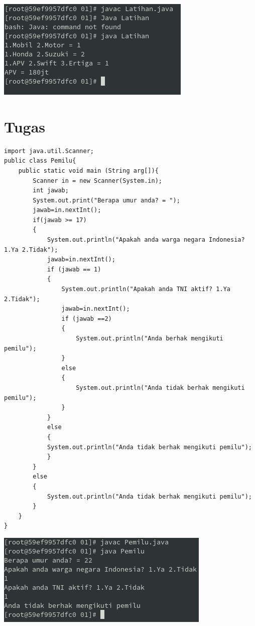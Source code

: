 \documentclass[a4paper,12pt]{article}
\begin{document}
\includegraphics{Latihan.png}

\section{Tugas}
\begin{lstlisting}[frame=single]
import java.util.Scanner;
public class Pemilu{
    public static void main (String arg[]){
        Scanner in = new Scanner(System.in);
        int jawab;
        System.out.print("Berapa umur anda? = ");
        jawab=in.nextInt();
        if(jawab >= 17)
        {
            System.out.println("Apakah anda warga negara Indonesia? 1.Ya 2.Tidak");
            jawab=in.nextInt();
            if (jawab == 1) 
            {
                System.out.println("Apakah anda TNI aktif? 1.Ya 2.Tidak");
                jawab=in.nextInt();
                if (jawab ==2) 
                {
                    System.out.println("Anda berhak mengikuti pemilu");
                }
                else
                {
                    System.out.println("Anda tidak berhak mengikuti pemilu");
                }
            }
            else
            {
            System.out.println("Anda tidak berhak mengikuti pemilu");
            }
        }
        else
        {
            System.out.println("Anda tidak berhak mengikuti pemilu");
        }
    }
}
\end{lstlisting}
\includegraphics{Pemilu_program.png}
\end{document}
